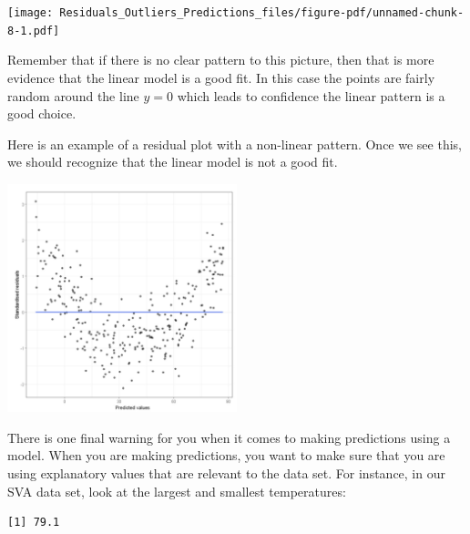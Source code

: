 \documentclass[
  letterpaper,
  DIV=11,
  numbers=noendperiod]{scrreprt}
\newenvironment{Shaded}{\begin{snugshade}}{\end{snugshade}}
\newcommand{\CommentTok}[1]{\textcolor[rgb]{0.37,0.37,0.37}{#1}}
\newcommand{\FunctionTok}[1]{\textcolor[rgb]{0.28,0.35,0.67}{#1}}
\newcommand{\NormalTok}[1]{\textcolor[rgb]{0.00,0.23,0.31}{#1}}
\newcommand{\SpecialCharTok}[1]{\textcolor[rgb]{0.37,0.37,0.37}{#1}}
\begin{document}
\texttt{[image: Residuals\_Outliers\_Predictions\_files/figure-pdf/unnamed-chunk-8-1.pdf]}

Remember that if there is no clear pattern to this picture, then that is
more evidence that the linear model is a good fit. In this case the
points are fairly random around the line \(y = 0\) which leads to
confidence the linear pattern is a good choice.

Here is an example of a residual plot with a non-linear pattern. Once we
see this, we should recognize that the linear model is not a good fit.

\includegraphics[width=0.5\textwidth,height=\textheight]{./images/ROP_9.jpg}

There is one final warning for you when it comes to making predictions
using a model. When you are making predictions, you want to make sure
that you are using explanatory values that are relevant to the data set.
For instance, in our SVA data set, look at the largest and smallest
temperatures:

\begin{Shaded}
\end{Shaded}

\begin{verbatim}
[1] 79.1
\end{verbatim}

\begin{Shaded}
\end{Shaded}
\end{document}
